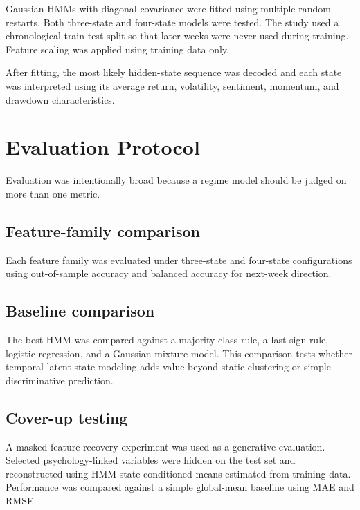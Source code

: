 \documentclass[conference]{IEEEtran}
\begin{document}
Gaussian HMMs with diagonal covariance were fitted using multiple random restarts. Both three-state and four-state models were tested. The study used a chronological train-test split so that later weeks were never used during training. Feature scaling was applied using training data only.

After fitting, the most likely hidden-state sequence was decoded and each state was interpreted using its average return, volatility, sentiment, momentum, and drawdown characteristics.

\section{Evaluation Protocol}
Evaluation was intentionally broad because a regime model should be judged on more than one metric.

\subsection{Feature-family comparison}
Each feature family was evaluated under three-state and four-state configurations using out-of-sample accuracy and balanced accuracy for next-week direction.



\subsection{Baseline comparison}
The best HMM was compared against a majority-class rule, a last-sign rule, logistic regression, and a Gaussian mixture model. This comparison tests whether temporal latent-state modeling adds value beyond static clustering or simple discriminative prediction.



\subsection{Cover-up testing}
A masked-feature recovery experiment was used as a generative evaluation. Selected psychology-linked variables were hidden on the test set and reconstructed using HMM state-conditioned means estimated from training data. Performance was compared against a simple global-mean baseline using MAE and RMSE.


\end{document}
